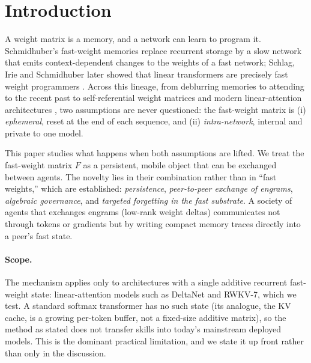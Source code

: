 \documentclass[11pt]{article}
\theoremstyle{definition}
\newcommand{\F}{F}
\begin{document}
\begin{abstract}
\end{abstract}

\section{Introduction}

A weight matrix is a memory, and a network can learn to program it. Schmidhuber's fast-weight memories \cite{schmidhuber1992} replace recurrent storage by a slow network that emits context-dependent changes to the weights of a fast network; Schlag, Irie and Schmidhuber later showed that linear transformers are precisely fast weight programmers \cite{schlag2021}. Across this lineage, from deblurring memories \cite{hinton1987} to attending to the recent past \cite{ba2016} to self-referential weight matrices \cite{irie2022} and modern linear-attention architectures \cite{yang2024gdn}, two assumptions are never questioned: the fast-weight matrix is (i) \emph{ephemeral}, reset at the end of each sequence, and (ii) \emph{intra-network}, internal and private to one model.

This paper studies what happens when both assumptions are lifted. We treat the fast-weight matrix $\F$ as a persistent, mobile object that can be exchanged between agents. The novelty lies in their combination rather than in ``fast weights,'' which are established: \emph{persistence}, \emph{peer-to-peer exchange of engrams}, \emph{algebraic governance}, and \emph{targeted forgetting in the fast substrate}. A society of agents that exchanges engrams (low-rank weight deltas) communicates not through tokens or gradients but by writing compact memory traces directly into a peer's fast state.

\paragraph{Scope.}
The mechanism applies only to architectures with a single additive recurrent fast-weight state: linear-attention models such as DeltaNet and RWKV-7, which we test. A standard softmax transformer has no such state (its analogue, the KV cache, is a growing per-token buffer, not a fixed-size additive matrix), so the method as stated does not transfer skills into today's mainstream deployed models. This is the dominant practical limitation, and we state it up front rather than only in the discussion.
\end{document}
